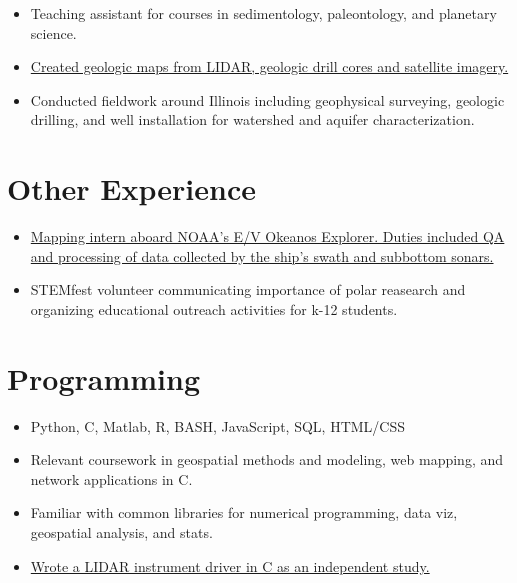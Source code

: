 \documentclass{cv_TOH}
\begin{document}
\begin{itemize}
\item Teaching assistant for courses in sedimentology, paleontology, and planetary science.
\end{itemize}

\begin{itemize}
\item \href{http://www.isgs.illinois.edu/sites/isgs/files/maps/isgs-quads/aurora-south-sg.pdf}{Created geologic maps from LIDAR, geologic drill cores and satellite imagery.}
\item Conducted fieldwork around Illinois including geophysical surveying, geologic drilling, and well installation for watershed and aquifer characterization. 
\end{itemize}

\section{Other Experience}
\begin{itemize}
\item\href{http://www.niutoday.info/2014/04/17/niu-student-lands-coveted-internship-aboard-exploration-ship/}{Mapping intern aboard NOAA's E/V Okeanos Explorer. Duties included QA and processing of data collected by the ship's swath and subbottom sonars.}
\item STEMfest volunteer communicating importance of polar reasearch and organizing educational outreach activities for k-12 students.
\end{itemize}

\section{Programming}
\begin{itemize}
\item Python, C, Matlab, R, BASH, JavaScript, SQL, HTML/CSS
\item Relevant coursework in geospatial methods and modeling, web mapping, and network applications in C.
\item Familiar with common libraries for numerical programming, data viz, geospatial analysis, and stats.
\item \href{https://github.com/tohodson/velodyne_tools}{Wrote a LIDAR instrument driver in C as an independent study.}
\end{itemize}
\end{document}
